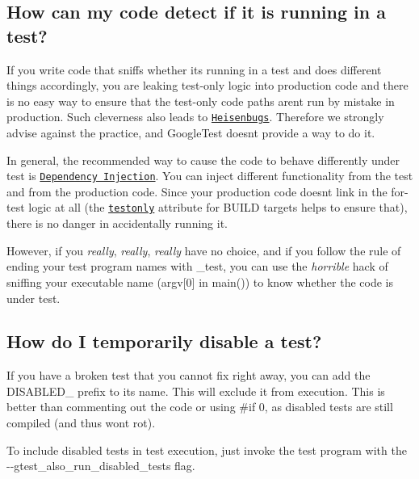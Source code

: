 \subsection*{How can my code detect if it is running in a test?}

If you write code that sniffs whether it\textquotesingle{}s running in a test and does different things accordingly, you are leaking test-\/only logic into production code and there is no easy way to ensure that the test-\/only code paths aren\textquotesingle{}t run by mistake in production. Such cleverness also leads to \href{https://en.wikipedia.org/wiki/Heisenbug}{\tt Heisenbugs}. Therefore we strongly advise against the practice, and Google\+Test doesn\textquotesingle{}t provide a way to do it.

In general, the recommended way to cause the code to behave differently under test is \href{https://en.wikipedia.org/wiki/Dependency_injection}{\tt Dependency Injection}. You can inject different functionality from the test and from the production code. Since your production code doesn\textquotesingle{}t link in the for-\/test logic at all (the \href{https://docs.bazel.build/versions/master/be/common-definitions.html#common.testonly}{\tt {\ttfamily testonly}} attribute for B\+U\+I\+LD targets helps to ensure that), there is no danger in accidentally running it.

However, if you {\itshape really}, {\itshape really}, {\itshape really} have no choice, and if you follow the rule of ending your test program names with {\ttfamily \+\_\+test}, you can use the {\itshape horrible} hack of sniffing your executable name ({\ttfamily argv\mbox{[}0\mbox{]}} in {\ttfamily main()}) to know whether the code is under test.

\subsection*{How do I temporarily disable a test?}

If you have a broken test that you cannot fix right away, you can add the {\ttfamily D\+I\+S\+A\+B\+L\+E\+D\+\_\+} prefix to its name. This will exclude it from execution. This is better than commenting out the code or using {\ttfamily \#if 0}, as disabled tests are still compiled (and thus won\textquotesingle{}t rot).

To include disabled tests in test execution, just invoke the test program with the {\ttfamily -\/-\/gtest\+\_\+also\+\_\+run\+\_\+disabled\+\_\+tests} flag.

